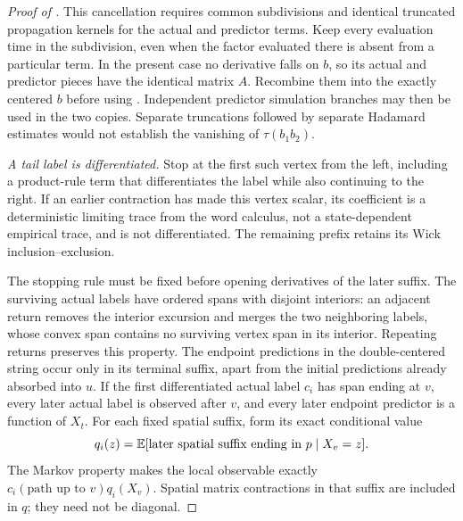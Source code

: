 \begin{proof}[Proof of ]
This cancellation requires common subdivisions and identical
truncated propagation kernels for the actual and predictor terms.
Keep every evaluation time in the subdivision, even when the factor
evaluated there is absent from a particular term. In the present case no derivative falls
on $b$, so its actual and predictor pieces have the identical matrix
$A$. Recombine them into the exactly centered $b$ before using
. Independent predictor simulation
branches may then be used in the two copies. Separate truncations
followed by separate Hadamard estimates would not establish the
vanishing of $\tau(b_1b_2)$.

\emph{A tail label is differentiated.} Stop at the first such vertex
from the left, including a product-rule term that differentiates the
label while also continuing to the right. If an earlier contraction
has made this vertex scalar, its coefficient is a deterministic
limiting trace from the word calculus, not a state-dependent empirical
trace, and is not differentiated. The remaining prefix retains its
Wick inclusion--exclusion.

The stopping rule must be fixed before opening derivatives of the
later suffix. The surviving actual labels have ordered spans with
disjoint interiors: an adjacent return removes the interior excursion
and merges the two neighboring labels, whose convex span contains no
surviving vertex span in its interior. Repeating returns preserves
this property.
The endpoint predictions in the double-centered string occur only
in its terminal suffix, apart from the initial predictions already
absorbed into $u$. If the first differentiated actual label $c_i$ has
span ending at $v$, every later actual label is observed after $v$,
and every later endpoint predictor is a function of $X_t$. For each
fixed spatial suffix, form its exact conditional value
\begin{equation}\label{eq:hidden-stopped-suffix}
 q_i(z)=\mathbb E[\text{later spatial suffix ending in }p\mid X_v=z].
\end{equation}
The Markov property makes the local observable exactly
$c_i(\text{path up to }v)q_i(X_v)$. Spatial matrix contractions in
that suffix are included in $q$; they need not be diagonal.


\end{proof}
